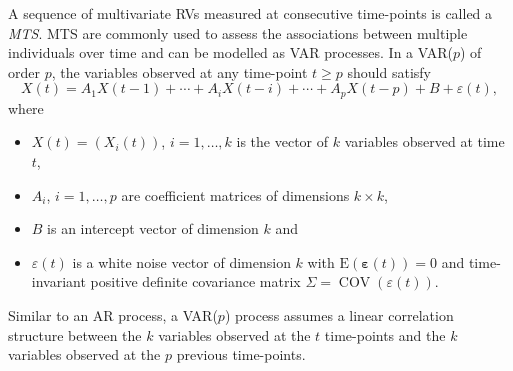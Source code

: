 A sequence of multivariate \acp{RV} measured at consecutive time-points is called a \textit{\ac{MTS}}. \ac{MTS} are commonly used to assess the associations between multiple individuals over time and can be modelled as \ac{VAR} processes. In a \ac{VAR}($p$) of order $p$, the variables observed at any time-point $t \geqslant p$ should satisfy
\begin{equation}
X(t)=A_{1} X(t-1)+\cdots+A_{i} X(t-i)+\cdots+A_{p} X(t-p)+B+\varepsilon(t),
\label{eq:multivariate_ts}
\end{equation}
where
\begin{itemize}
\item $X(t)=\left(X_{i}(t)\right)$, $i=1,\ldots,k$ is the vector of $k$ variables observed at time $t$,
\item $A_{i}$, $i=1,\ldots,p$ are coefficient matrices of dimensions $k \times k$,
\item $B$ is an intercept vector of dimension $k$ and
\item $\varepsilon(t)$ is a white noise vector of dimension $k$ with $\mathrm{E}(\boldsymbol{\varepsilon}(t))=0$ and time-invariant positive definite covariance matrix $\Sigma = \operatorname{COV}(\varepsilon(t))$.
\end{itemize}
Similar to an \ac{AR} process, a \ac{VAR}($p$) process assumes a linear correlation structure between the $k$ variables observed at the $t$ time-points and the $k$ variables observed at the $p$ previous time-points.







